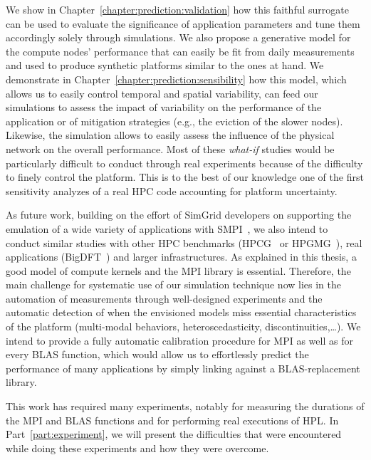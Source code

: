     We show in Chapter~\ref{chapter:prediction:validation} how this faithful surrogate can be used to evaluate the
    significance of application parameters and tune them accordingly solely through simulations.  We also propose a
    generative model for the compute nodes' performance that can easily be fit from daily measurements and used to
    produce synthetic platforms similar to the ones at hand. We demonstrate in
    Chapter~\ref{chapter:prediction:sensibility} how this model, which allows us to easily control temporal and spatial
    variability, can feed our simulations to assess the impact of variability on the performance of the application or
    of mitigation strategies (e.g., the eviction of the slower nodes). Likewise, the simulation allows to easily assess
    the influence of the physical network on the overall performance. Most of these \emph{what-if} studies would be
    particularly difficult to conduct through real experiments because of the difficulty to finely control the platform.
    This is to the best of our knowledge one of the first sensitivity analyzes of a real HPC code accounting for
    platform uncertainty.

    As future work, building on the effort of SimGrid developers on supporting the emulation of a wide variety of
    applications with SMPI~\cite{smpi_proxy_apps}, we also intend to conduct similar studies with other HPC benchmarks
    (\eg HPCG~\cite{HPCG} or HPGMG~\cite{HPGMG}), real applications (\eg BigDFT~\cite{bigdft}) and larger infrastructures.
    As explained in this thesis, a good model of compute kernels and the MPI library is essential. Therefore, the main
    challenge for systematic use of our simulation technique now lies in the automation of measurements through
    well-designed experiments and the automatic detection of when the envisioned models miss essential characteristics
    of the platform (multi-modal behaviors, heteroscedasticity, discontinuities,\dots{}). We intend to provide a fully
    automatic calibration procedure for MPI as well as for every BLAS function, which would allow us to effortlessly
    predict the performance of many applications by simply linking against a BLAS-replacement library.

    This work has required many experiments, notably for measuring the durations of the MPI and BLAS functions and for
    performing real executions of HPL. In Part~\ref{part:experiment}, we will present the difficulties that were
    encountered while doing these experiments and how they were overcome.
